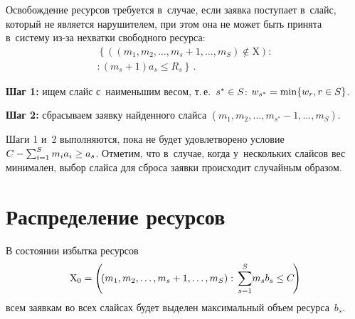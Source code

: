 \begin{multicols}{2}
  Освобождение ресурсов требуется в~случае, если заявка поступает в~слайс, 
который не является нарушителем, при этом она не может быть принята 
в~сис\-те\-му из-за нехватки свободного ресурса: 
\begin{multline*}
\left\{ \left( \left( m_1, m_2, \ldots , m_s+1, \ldots , m_S\right) \notin 
\mathrm{X}\right) :{}\right.\\
\left.{}: \left( m_s+1\right)a_s\leq R_s\right\}\,.
\end{multline*}

 \textbf{Шаг 1:} ищем слайс с~наименьшим весом, т.\,е.\ $s^*\hm\in S$: $w_{s^*}\hm= 
\min \{ w_r, r\hm\in S\}$.
  
  \textbf{Шаг 2:} сбрасываем заявку найденного слайса $(m_1, m_2, \ldots , m_{s^*}-1, 
\ldots , m_S)$.
  
  Шаги 1 и~2 выполняются, пока не будет удовле\-тво\-ре\-но условие $C\hm- 
\sum\nolimits^S_{i=1} m_i a_i\hm\geq a_s$. Отметим, что в~случае, когда 
у~нескольких слайсов вес минимален, выбор слайса для сброса заявки 
происходит случайным образом.
  
  
  \section{Распределение ресурсов}
  
  В состоянии избытка ресурсов 
  $$
  \mathrm{X}_0= \left(\! \left(m_1, m_2, \ldots , 
m_s+1, \ldots, m_S\right): \ \!\sum\limits^S_{s=1}\! m_s b_s \hm\leq C\!\right)
\hspace*{-0.94673pt}
$$ 
всем  заявкам во всех слайсах будет выделен максимальный объем ресурса~$b_s$.
  

\end{multicols}
